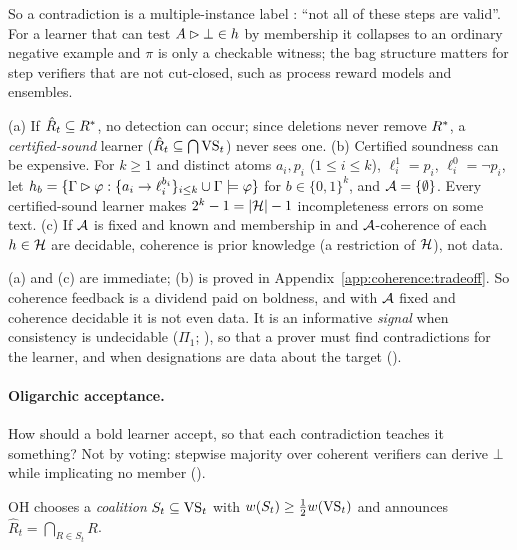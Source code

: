 So a contradiction is a multiple-instance label \citep{dietterich1997solving}: ``not all of these steps are valid''. For a learner that can test $A\rhd\bot\in h$ by membership it collapses to an ordinary negative example and $\pi$ is only a checkable witness; the bag structure matters for step verifiers that are not cut-closed, such as process reward models and ensembles.

\begin{proposition}\label{prop:coherence:caution}
\textup{(a)} If $\hat R_t\subseteq R^{*}$, no detection can occur; since deletions never remove $R^{*}$, a \emph{certified-sound} learner ($\hat R_t\subseteq\bigcap\mathrm{VS}_t$) never sees one.
\textup{(b)} Certified soundness can be expensive. For $k\ge1$ and distinct atoms $a_i,p_i$ ($1\le i\le k$), $\ell^1_i=p_i$, $\ell^0_i=\neg p_i$, let $h_b=\{\Gamma\rhd\varphi:\{a_i\to\ell_i^{b_i}\}_{i\le k}\cup\Gamma\models\varphi\}$ for $b\in\{0,1\}^k$, and $\mathcal{A}=\{\emptyset\}$. Every certified-sound learner makes $2^k-1=|\mathcal{H}|-1$ incompleteness errors on some text.
\textup{(c)} If $\mathcal{A}$ is fixed and known and membership in and $\mathcal{A}$-coherence of each $h\in\mathcal{H}$ are decidable, coherence is prior knowledge (a restriction of $\mathcal{H}$), not data.
\end{proposition}

(a) and (c) are immediate; (b) is proved in Appendix~\ref{app:coherence:tradeoff}. So coherence feedback is a dividend paid on boldness, and with $\mathcal{A}$ fixed and coherence decidable it is not even data. It is an informative \emph{signal} when consistency is undecidable ($\Pi_1$; ), so that a prover must find contradictions for the learner, and when designations are data about the target ().

\paragraph{Oligarchic acceptance.} How should a bold learner accept, so that each contradiction teaches it something? Not by voting: stepwise majority over coherent verifiers can derive $\bot$ while implicating no member ().

\begin{definition}\label{def:coherence:oh}
OH chooses a \emph{coalition} $S_t\subseteq\mathrm{VS}_t$ with $w(S_t)\ge\frac12w(\mathrm{VS}_t)$ and announces $\hat R_t=\bigcap_{R\in S_t}R$.
\end{definition}

